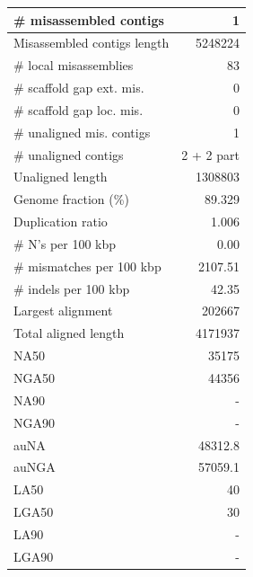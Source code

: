 \documentclass[12pt,a4paper]{article}
\begin{document}
\begin{table}[ht]
\begin{center}
\begin{tabular}{|l*{1}{|r}|}
\# misassembled contigs & 1 \\ \hline
Misassembled contigs length & 5248224 \\ \hline
\# local misassemblies & 83 \\ \hline
\# scaffold gap ext. mis. & 0 \\ \hline
\# scaffold gap loc. mis. & 0 \\ \hline
\# unaligned mis. contigs & 1 \\ \hline
\# unaligned contigs & 2 + 2 part \\ \hline
Unaligned length & 1308803 \\ \hline
Genome fraction (\%) & 89.329 \\ \hline
Duplication ratio & 1.006 \\ \hline
\# N's per 100 kbp & 0.00 \\ \hline
\# mismatches per 100 kbp & 2107.51 \\ \hline
\# indels per 100 kbp & 42.35 \\ \hline
Largest alignment & 202667 \\ \hline
Total aligned length & 4171937 \\ \hline
NA50 & 35175 \\ \hline
NGA50 & 44356 \\ \hline
NA90 & - \\ \hline
NGA90 & - \\ \hline
auNA & 48312.8 \\ \hline
auNGA & 57059.1 \\ \hline
LA50 & 40 \\ \hline
LGA50 & 30 \\ \hline
LA90 & - \\ \hline
LGA90 & - \\ \hline
\end{tabular}
\end{center}
\end{table}
\end{document}
